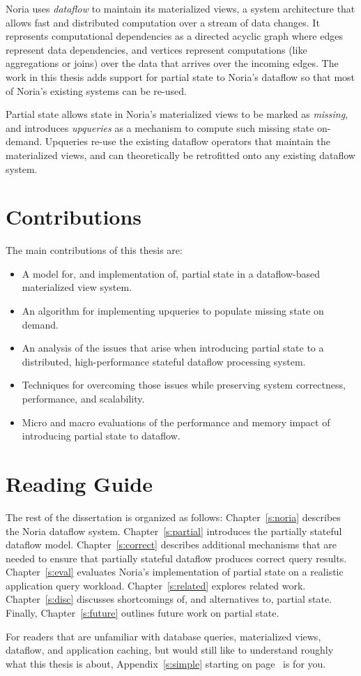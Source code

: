 Noria uses \textit{dataflow} to maintain its materialized views, a system
architecture that allows fast and distributed computation over a stream of data
changes. It represents computational dependencies as a directed acyclic graph
where edges represent data dependencies, and vertices represent computations
(like aggregations or joins) over the data that arrives over the incoming edges.
The work in this thesis adds support for partial state to Noria's dataflow so
that most of Noria's existing systems can be re-used.

Partial state allows state in Noria's materialized views to be marked as
\textit{missing}, and introduces \textit{upqueries} as a mechanism to compute
such missing state on-demand. Upqueries re-use the existing dataflow operators
that maintain the materialized views, and can theoretically be retrofitted onto
any existing dataflow system.

\section{Contributions}

The main contributions of this thesis are:

\begin{itemize}
 \item A model for, and implementation of, partial state in a dataflow-based
   materialized view system.
 \item An algorithm for implementing upqueries to populate missing state on
   demand.
 \item An analysis of the issues that arise when introducing partial state to a
   distributed, high-performance stateful dataflow processing system.
 \item Techniques for overcoming those issues while preserving system
	 correctness, performance, and scalability.
 \item Micro and macro evaluations of the performance and memory impact of
	 introducing partial state to dataflow.
\end{itemize}

\section{Reading Guide}

The rest of the dissertation is organized as follows: Chapter~\ref{s:noria}
describes the Noria dataflow system. Chapter~\ref{s:partial} introduces the
partially stateful dataflow model. Chapter~\ref{s:correct} describes additional
mechanisms that are needed to ensure that partially stateful dataflow produces
correct query results. Chapter~\ref{s:eval} evaluates Noria's implementation of
partial state on a realistic application query workload. Chapter~\ref{s:related}
explores related work. Chapter~\ref{s:disc} discusses shortcomings of, and
alternatives to, partial state. Finally, Chapter~\ref{s:future} outlines future
work on partial state.

For readers that are unfamiliar with database queries, materialized views,
dataflow, and application caching, but would still like to understand roughly
what this thesis is about, Appendix~\ref{s:simple} starting on
page~\pageref{s:simple} is for you.
